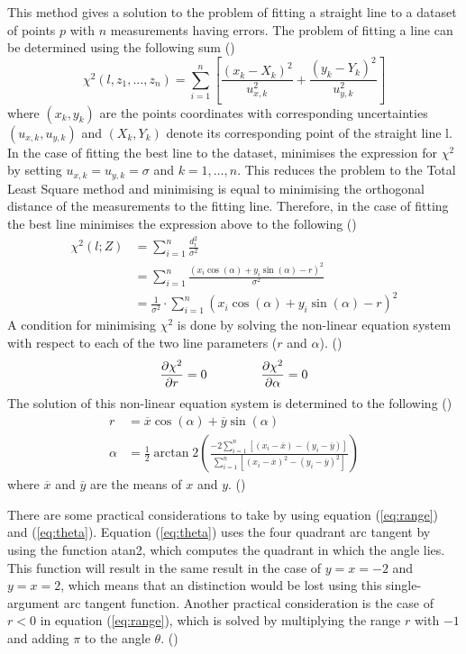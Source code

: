 \documentclass[../Head/Main.tex]{subfiles}
\begin{document}
\clearpage 
This method gives a solution to the problem of fitting a straight line to a dataset of points $p$ with $n$ measurements having errors. The problem of fitting a line can be determined using the following sum (\cite[1-3]{TLSM})
\begin{equation}
    \chi^2\left(l, z_1, ..., z_n\right) = \sum_{i = 1}^{n} \left[\frac{\left(x_k - X_k\right)^2}{u_{x, k}^{2}} + \frac{\left(y_k - Y_k\right)^2}{u_{y, k}^{2}}\right]
\end{equation}
where $(x_k,y_k)$ are the points coordinates with corresponding uncertainties $(u_{x, k},u_{y, k})$ and $(X_k,Y_k)$ denote its corresponding point of the straight line l. In the case of fitting the best line to the dataset, minimises the expression for $\chi^2$ by setting $u_{x, k}=u_{y, k}=\sigma$ and $k=1,…,n$. This reduces the problem to the Total Least Square method and minimising is equal to minimising the orthogonal distance of the measurements to the fitting line. Therefore, in the case  of fitting the best line minimises the expression above to the following (\cite[1-3]{TLSM})
\begin{align}
    \chi^2\left(l; Z\right) &= \sum_{i = 1}^{n} \frac{d_i^2}{\sigma^2} \\
    &= \sum_{i = 1}^{n}\frac{\left(x_i\cos(\alpha) + y_i\sin(\alpha)-r\right)^2}{\sigma^2}\\
    &= \frac{1}{\sigma^2}\cdot\sum_{i = 1}^{n}\left(x_i\cos(\alpha) + y_i\sin(\alpha)-r\right)^2
\end{align}
A condition for minimising $\chi^2$ is done by solving the non-linear equation system with respect to each of the two line parameters ($r$ and $\alpha$). (\cite[1-3]{TLSM})
\begin{align}
    \frac{\partial\chi^2}{\partial r} = 0 \hspace{1.5cm} \frac{\partial\chi^2}{\partial\alpha} = 0
\end{align}
The solution of this non-linear equation system is determined to the following (\cite[1-3]{TLSM})
\begin{align}
	r &= \overline{x}\cos(\alpha)+\overline{y}\sin(\alpha) \label{eq:range} \\
    \alpha &= \frac{1}{2}\arctan2\left(\frac{-2\sum_{i=1}^{n}\left[\left(x_i-\overline{x}\right) - \left(y_i-\overline{y}\right)\right]}{\sum_{i = 1}^{n}\left[\left(x_i-\overline{x}\right)^2 - \left(y_i-\overline{y}\right)^2\right]}\right) \label{eq:theta}
\end{align}
where $\overline{x}$ and $\overline{y}$ are the means of $x$ and $y$. (\cite[1-3]{TLSM}) \par
There are some practical considerations to take by using equation (\ref{eq:range}) and (\ref{eq:theta}). Equation (\ref{eq:theta}) uses the four quadrant arc tangent by using the function atan2, which computes the quadrant in which the angle lies. This function will result in the same result in the case of $y  = x = -2$ and $y = x = 2$, which means that an distinction would be lost using this single-argument arc tangent function. Another practical consideration is the case of $r < 0$ in equation (\ref{eq:range}), which is solved by multiplying the range $r$ with $-1$ and adding $\pi$ to the angle $\theta$. (\cite[1-3]{TLSM})
\end{document}
